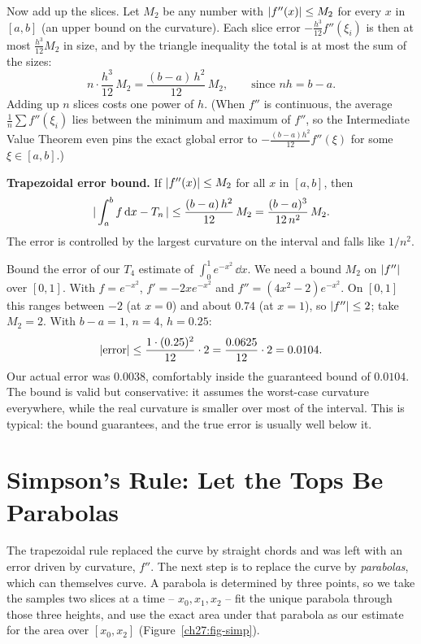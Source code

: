 Now add up the slices. Let $M_2$ be any number with $\lvert f''(x)\rvert\le M_2$ for every $x$ in $[a,b]$ (an upper bound on the curvature). Each slice error $-\frac{h^3}{12}f''(\xi_i)$ is then at most $\frac{h^3}{12}M_2$ in size, and by the triangle inequality the total is at most the sum of the sizes:
\[
n\cdot\frac{h^3}{12}\,M_2 = \frac{(b-a)\,h^2}{12}\,M_2, \qquad\text{since } nh = b-a.
\]
Adding up $n$ slices costs one power of $h$. (When $f''$ is continuous, the average $\frac1n\sum f''(\xi_i)$ lies between the minimum and maximum of $f''$, so the Intermediate Value Theorem even pins the exact global error to $-\frac{(b-a)h^2}{12}f''(\xi)$ for some $\xi\in[a,b]$.)

\begin{focusbox}
\textbf{Trapezoidal error bound.} If $\lvert f''(x)\rvert \le M_2$ for all $x$ in $[a,b]$, then
\[
\lvert\,\int_a^b f\,\mathrm{d} x - T_n\,\rvert \le \frac{(b-a)\,h^2}{12}\,M_2 = \frac{(b-a)^3}{12\,n^2}\,M_2.
\]
The error is controlled by the largest curvature on the interval and falls like $1/n^2$.
\end{focusbox}

\begin{labbox}
Bound the error of our $T_4$ estimate of $\int_0^1 e^{-x^2}\,\dd x$. We need a bound $M_2$ on $\lvert f''\rvert$ over $[0,1]$. With $f = e^{-x^2}$, $f' = -2x e^{-x^2}$ and $f'' = (4x^2 - 2)e^{-x^2}$. On $[0,1]$ this ranges between $-2$ (at $x=0$) and about $0.74$ (at $x=1$), so $\lvert f''\rvert \le 2$; take $M_2 = 2$. With $b-a = 1$, $n=4$, $h = 0.25$:
\[
\lvert\text{error}\rvert \le \frac{1 \cdot (0.25)^2}{12}\cdot 2 = \frac{0.0625}{12}\cdot 2 = 0.0104.
\]
Our actual error was $0.0038$, comfortably inside the guaranteed bound of $0.0104$. The bound is valid but conservative: it assumes the worst-case curvature everywhere, while the real curvature is smaller over most of the interval. This is typical: the bound guarantees, and the true error is usually well below it.
\end{labbox}

\section{Simpson's Rule: Let the Tops Be Parabolas}
\label{ch27:simpson}

The trapezoidal rule replaced the curve by straight chords and was left with an error driven by curvature, $f''$. The next step is to replace the curve by \emph{parabolas}, which can themselves curve. A parabola is determined by three points, so we take the samples two slices at a time -- $x_0, x_1, x_2$ -- fit the unique parabola through those three heights, and use the exact area under that parabola as our estimate for the area over $[x_0, x_2]$ (Figure~\ref{ch27:fig-simp}).

